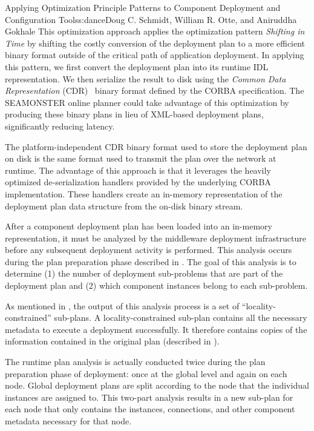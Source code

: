 \begin{aosachapter}{Applying Optimization Principle Patterns to Component Deployment and
                    Configuration Tools}{s:dance}{Doug C. Schmidt, William R. Otte, and Aniruddha Gokhale}
This optimization approach applies the optimization pattern
\emph{Shifting in Time} by shifting the costly conversion of the
deployment plan to a more efficient binary format outside of the
critical path of application deployment. In applying this pattern, we
first convert the deployment plan into its runtime IDL representation.
We then serialize the result to disk using the \emph{Common Data
Representation} (CDR)~\cite{CORBA:08b} binary format defined by the
CORBA specification. The SEAMONSTER online planner could take advantage
of this optimization by producing these binary plans in lieu of
XML-based deployment plans, significantly reducing latency.

The platform-independent CDR binary format used to store the deployment
plan on disk is the same format used to transmit the plan over the
network at runtime. The advantage of this approach is that it leverages
the heavily optimized de-serialization handlers provided by the
underlying CORBA implementation. These handlers create an in-memory
representation of the deployment plan data structure from the on-disk
binary stream.


\label{sec.opp.analysis}


After a component deployment plan has been loaded into an in-memory
representation, it must be analyzed by the middleware deployment
infrastructure before any subsequent deployment activity is performed.
This analysis occurs during the plan preparation phase described in
. The goal of this analysis is to
determine (1) the number of deployment sub-problems that are part of the
deployment plan and (2) which component instances belong to each
sub-problem.

As mentioned in , the output of this
analysis process is a set of ``locality-constrained'' sub-plans. A
locality-constrained sub-plan contains all the necessary metadata to
execute a deployment successfully. It therefore contains copies of the
information contained in the original plan (described in
).

The runtime plan analysis is actually conducted twice during the plan
preparation phase of deployment: once at the global level and again on
each node. Global deployment plans are split according to the node that
the individual instances are assigned to. This two-part analysis results
in a new sub-plan for each node that only contains the instances,
connections, and other component metadata necessary for that node.


\end{aosachapter}
